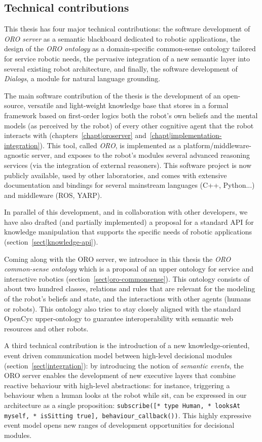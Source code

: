 \subsection{Technical contributions}
\label{sect|technical-contributions}


This thesis has four major technical contributions: the software development of
\emph{ORO server} as a semantic blackboard dedicated to robotic applications,
the design of the \emph{ORO ontology} as a domain-specific common-sense
ontology tailored for service robotic needs, the pervasive integration of a new
semantic layer into several existing robot architecture, and finally, the
software development of \emph{Dialogs}, a module for natural language
grounding.

The main software contribution of the thesis is the development of an
open-source, versatile and light-weight knowledge base that stores in a formal
framework based on first-order logics both the robot's own beliefs and the
mental models (as perceived by the robot) of every other cognitive agent that
the robot interacts with (chapters~\ref{chapt|oroserver}
and~\ref{chapt|implementation-integration}).  This tool, called \emph{ORO}, is
implemented as a platform/middleware-agnostic server, and exposes to the
robot's modules several advanced reasoning services (via the integration of
external reasoners). This software project is now publicly available, used by
other laboratories, and comes with extensive documentation and bindings for
several mainstream languages (C++, Python...) and middleware (ROS, YARP).

In parallel of this development, and in collaboration with other developers, we
have also drafted (and partially implemented) a proposal for a standard API for
knowledge manipulation that supports the specific needs of robotic applications
(section~\ref{sect|knowledge-api}).

Coming along with the ORO server, we introduce in this thesis the \emph{ORO
common-sense ontology} which is a proposal of an upper ontology for service and
interactive robotics (section~\ref{sect|oro-commonsense}). This ontology
consists of about two hundred classes, relations and rules that are relevant
for the modeling of the robot's beliefs and state, and the interactions with
other agents (humans or robots). This ontology also tries to stay closely
aligned with the standard {\sc OpenCyc} upper-ontology to guarantee
interoperability with semantic web resources and other robots.

A third technical contribution is the introduction of a new knowledge-oriented,
event driven communication model between high-level decisional modules
(section~\ref{sect|integration}): by introducing the notion of \emph{semantic
events}, the ORO server enables the development of new executive layers that
combine reactive behaviour with high-level abstractions: for instance,
triggering a behaviour when a human looks at the robot while sit, can be
expressed in our architecture as a single proposition: {\tt subscribe([* type
Human, * looksAt myself, * isSitting true], behaviour\_callback())}. This
highly expressive event model opens new ranges of development opportunities for
decisional modules.

